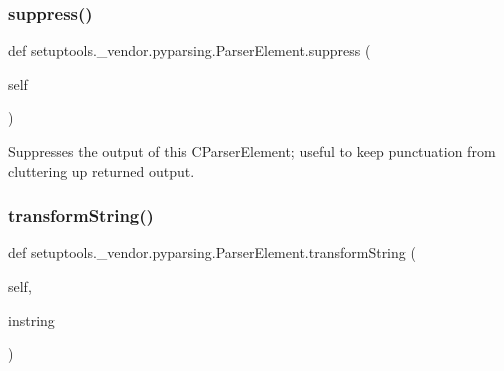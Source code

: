 \subsubsection{\texorpdfstring{suppress()}{suppress()}}
{\footnotesize\ttfamily def setuptools.\+\_\+vendor.\+pyparsing.\+Parser\+Element.\+suppress (\begin{DoxyParamCaption}\item[{}]{self }\end{DoxyParamCaption})}

\begin{DoxyVerb}Suppresses the output of this C{ParserElement}; useful to keep punctuation from
cluttering up returned output.
\end{DoxyVerb}
 \mbox{\label{classsetuptools_1_1__vendor_1_1pyparsing_1_1_parser_element_af25c27f581e141385fae3884f19274e8}} 
\subsubsection{\texorpdfstring{transform\+String()}{transformString()}}
{\footnotesize\ttfamily def setuptools.\+\_\+vendor.\+pyparsing.\+Parser\+Element.\+transform\+String (\begin{DoxyParamCaption}\item[{}]{self,  }\item[{}]{instring }\end{DoxyParamCaption})}


